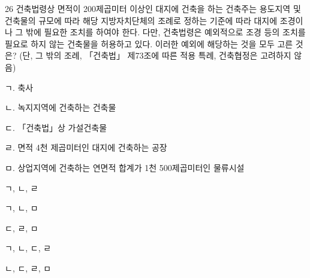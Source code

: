 \begin{question}{26}
건축법령상 면적이 200제곱미터 이상인 대지에 건축을 하는 건축주는 용도지역 및 건축물의 규모에 따라 해당 지방자치단체의 조례로 정하는 기준에 따라 대지에 조경이나 그 밖에 필요한 조치를 하여야 한다. 다만, 건축법령은 예외적으로 조경 등의 조치를 필요로 하지 않는 건축물을 허용하고 있다. 이러한 예외에 해당하는 것을 모두 고른 것은? (단, 그 밖의 조례, 「건축법」 제73조에 따른 적용 특례, 건축협정은 고려하지 않음)
\begin{framedtext}
ㄱ. 축사 \par
ㄴ. 녹지지역에 건축하는 건축물 \par
ㄷ. 「건축법」상 가설건축물 \par
ㄹ. 면적 4천 제곱미터인 대지에 건축하는 공장 \par
ㅁ. 상업지역에 건축하는 연면적 합계가 1천 500제곱미터인 물류시설 \par
\end{framedtext}
\begin{choices}
  \item ㄱ, ㄴ, ㄹ
  \item ㄱ, ㄴ, ㅁ
  \item ㄷ, ㄹ, ㅁ
  \item ㄱ, ㄴ, ㄷ, ㄹ
  \item ㄴ, ㄷ, ㄹ, ㅁ
\end{choices}
\end{question}
